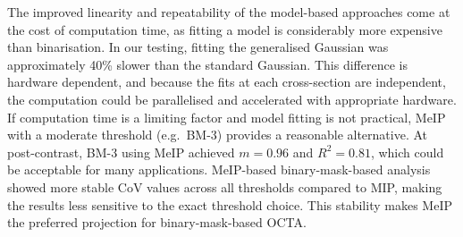 The improved linearity and repeatability of the model-based approaches come at the cost of computation time, as fitting a model is considerably more expensive than binarisation. In our testing, fitting the generalised Gaussian was approximately 40\% slower than the standard Gaussian. This difference is hardware dependent, and because the fits at each cross-section are independent, the computation could be parallelised and accelerated with appropriate hardware. If computation time is a limiting factor and model fitting is not practical, MeIP with a moderate threshold (e.g.\ BM-3) provides a reasonable alternative. At post-contrast, BM-3 using MeIP achieved $m = 0.96$ and $R^2 = 0.81$, which could be acceptable for many applications. MeIP-based binary-mask-based analysis showed more stable CoV values across all thresholds compared to MIP, making the results less sensitive to the exact threshold choice. This stability makes MeIP the preferred projection for binary-mask-based OCTA.

